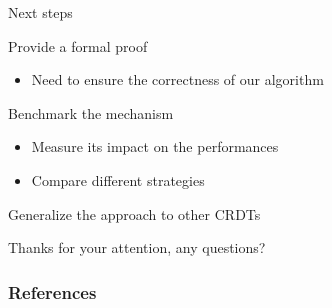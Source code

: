 \documentclass[10pt]{beamer}
\begin{document}
\begin{frame}{Next steps}

  \begin{block}{Provide a formal proof}
    \begin{itemize}
      \item Need to ensure the correctness of our algorithm
    \end{itemize}
  \end{block}

  \medskip

  \begin{block}{Benchmark the mechanism}
    \begin{itemize}
      \item Measure its impact on the performances
      \item Compare different strategies
    \end{itemize}
  \end{block}

  \medskip

  \begin{block}{Generalize the approach to other \acp{CRDT}}
  \end{block}
\end{frame}

\begin{frame}[standout]
  Thanks for your attention, any questions?
  \vspace{3em}
  \begin{center}
    \ccby
  \end{center}
\end{frame}

\begin{frame}[allowframebreaks]
  \frametitle{References}
  
  
\end{frame}
\end{document}
